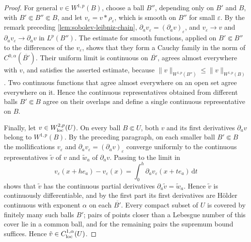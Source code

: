 \begin{proof}
For general $v\in W^{1,p}(B)$, choose a ball $B''$, depending only on $B'$ and $B$, with $B'\Subset B''\Subset B$, and let $v_\varepsilon=v*\rho_\varepsilon$, which is smooth on $B''$ for small $\varepsilon$. By the remark preceding \cref{lem:sobolev-leibniz-chain}, $\partial_av_\varepsilon=(\partial_av)_\varepsilon$, and $v_\varepsilon\to v$ and $\partial_av_\varepsilon\to\partial_av$ in $L^p(B'')$. The estimate for smooth functions, applied on $B'\Subset B''$ to the differences of the $v_\varepsilon$, shows that they form a Cauchy family in the norm of $C^{0,\alpha}(\overline{B'})$. Their uniform limit is continuous on $\overline{B'}$, agrees almost everywhere with $v$, and satisfies the asserted estimate, because $\|v\|_{W^{1,p}(B'')}\leq\|v\|_{W^{1,p}(B)}$. Two continuous functions that agree almost everywhere on an open set agree everywhere on it. Hence the continuous representatives obtained from different balls $B'\Subset B$ agree on their overlaps and define a single continuous representative on $B$.

Finally, let $v\in W^{2,p}_{\mathrm{loc}}(U)$. On every ball $B\Subset U$, both $v$ and its first derivatives $\partial_av$ belong to $W^{1,p}(B)$. By the preceding paragraph, on each smaller ball $B'\Subset B$ the mollifications $v_\varepsilon$ and $\partial_av_\varepsilon=(\partial_av)_\varepsilon$ converge uniformly to the continuous representatives $\tilde v$ of $v$ and $\tilde w_a$ of $\partial_av$. Passing to the limit in
\[
 v_\varepsilon(x+he_a)-v_\varepsilon(x)=\int_0^h\partial_av_\varepsilon(x+te_a)\,\mathrm d t
\]
shows that $\tilde v$ has the continuous partial derivatives $\partial_a\tilde v=\tilde w_a$. Hence $\tilde v$ is continuously differentiable, and by the first part its first derivatives are H\"older continuous with exponent $\alpha$ on each $\overline{B'}$. Every compact subset of $U$ is covered by finitely many such balls $B'$; pairs of points closer than a Lebesgue number of this cover lie in a common ball, and for the remaining pairs the supremum bound suffices. Hence $\tilde v\in C^{1,\alpha}_{\mathrm{loc}}(U)$.
\end{proof}
